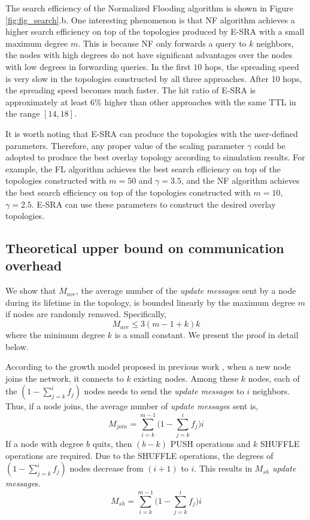 The search efficiency of the Normalized Flooding algorithm is shown in Figure \ref{fig:fig_search}.b. One interesting phenomenon is that NF algorithm achieves a higher search efficiency on top of the topologies produced by E-SRA with a small maximum degree $m$. This is because NF only forwards a query to $k$ neighbors, the nodes with high degrees do not have significant advantages over the nodes with low degrees in forwarding queries. In the first $10$ hops, the spreading speed is very slow in the topologies constructed by all three approaches. After 10 hops, the spreading speed becomes much faster. The hit ratio of E-SRA is approximately at least 6\% higher than other approaches with the same TTL in the range $[14, 18]$.

 It is worth noting that E-SRA can produce the topologies with the user-defined parameters. Therefore, any proper value of the scaling parameter $\gamma$ could be adopted to produce the best overlay topology according to simulation results. For example, the FL algorithm achieves the best search efficiency on top of the topologies constructed with $m=50$ and $\gamma=3.5$, and the NF algorithm achieves the best search efficiency on top of the topologies constructed with $m=10$, $\gamma=2.5$. E-SRA can use these parameters to construct the desired overlay topologies.
 

\subsection{Theoretical upper bound on communication overhead}
We show that $M_{ave}$, the average number of the \textit{update message}s sent by a node during its lifetime in the topology, is bounded linearly by the maximum degree $m$ if nodes are randomly removed. Specifically, 
\begin{equation} \label{eq:updatedegree}
 M_{ave} \leq 3(m - 1 + k)k
\end{equation}
where the minimum degree $k$ is a small constant. We present the proof in detail below.

According to the growth model proposed in previous work \cite{bulut2014constructing}, when a new node joins the network, it connects to $k$ existing nodes. Among these $k$ nodes, each of the $(1 - \sum_{j=k}^{i} f_j)$ nodes needs to send the \textit{update message}s to $i$ neighbors. Thus, if a node joins, the average number of \textit{update message}s sent is, 
\begin{equation}
M_{join} = \sum_{i=k}^{m-1} \big( 1 - \sum_{j=k}^{i} f_j \big) i
\end{equation}
If a node with degree $b$ quits, then $(b-k)$ PUSH operations and $k$ SHUFFLE operations are required. Due to the SHUFFLE operations, the degrees of $(1 - \sum_{j=k}^{i} f_j)$ nodes decrease from $(i+1)$ to $i$. This results in $M_{sh}$ \textit{update message}s.
\begin{equation}
M_{sh} = \sum_{i=k}^{m-1} \big( 1 - \sum_{j=k}^{i} f_j \big) i 
\end{equation}


